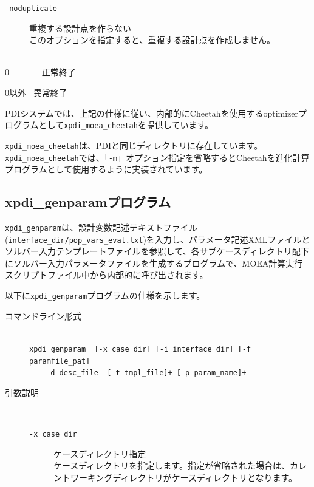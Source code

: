 \documentclass[a4paper,11pt]{jarticle}
\begin{document}
{\begin{description}
\begin{description}
\item[{\tt --noduplicate}] 重複する設計点を作らない\\
このオプションを指定すると、重複する設計点を作成しません。\\

\end{description}

\item[戻り値(終了ステータス)] {\ }\\
0 \ \ \ \ \ \ \ 正常終了

0以外 \ 異常終了
\end{description}

PDIシステムでは、上記の仕様に従い、内部的にCheetahを使用するoptimizerプログラムとして{\tt xpdi\_moea\_cheetah}を提供しています。

{\tt xpdi\_moea\_cheetah}は、PDIと同じディレクトリに存在しています。
{\tt xpdi\_moea\_cheetah}では、「{\tt -m}」オプション指定を省略するとCheetahを進化計算プログラムとして使用するように実装されています。


\newpage
\subsection{xpdi\_genparamプログラム}

{\tt xpdi\_genparam}は、設計変数記述テキストファイル({\tt interface\_dir/pop\_vars\_eval.txt})を入力し、パラメータ記述XMLファイルとソルバー入力テンプレートファイルを参照して、各サブケースディレクトリ配下にソルバー入力パラメータファイルを生成するプログラムで、MOEA計算実行スクリプトファイル中から内部的に呼び出されます。

以下に{\tt xpdi\_genparam}プログラムの仕様を示します。

\begin{description}
\item[コマンドライン形式] {\ }\\
{\tt xpdi\_genparam \ [-x case\_dir] [-i interface\_dir] [-f paramfile\_pat]}\\
\ \ \ \ {\tt -d desc\_file \ [-t tmpl\_file]+ [-p param\_name]+}


\item[引数説明] {\ }\par
\begin{description}
\item[{\tt -x  case\_dir}] ケースディレクトリ指定\\
ケースディレクトリを指定します。指定が省略された場合は、カレントワーキングディレクトリがケースディレクトリとなります。\\


\end{description}
\end{description}}
\end{document}
